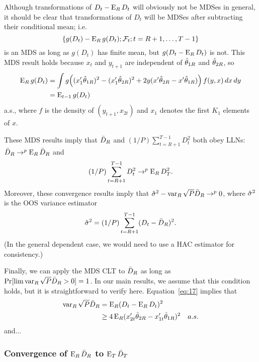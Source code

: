 \documentclass[12pt]{article}
\begin{document}
Although transformations of $D_t - \operatorname{E}_R D_t$ will obviously not be
MDSes in general, it should be clear that transformations of $D_t$
will be MDSes after subtracting their conditional mean; i.e.
\begin{equation}
  \{g(D_t) - \operatorname{E}_R g(D_t); \mathcal{F}_t; t = R+1,\dots,T-1\}
\end{equation}
is an MDS as long as
$g(D_t)$ has finite mean, but $g(D_t - \operatorname{E}_R D_t)$ is not. This MDS
result holds because $x_t$ and $y_{t+1}$ are independent of $\hat\theta_{1R}$
and $\hat\theta_{2R}$, so
\begin{equation}\begin{split}
  \operatorname{E}_R g(D_t)
  &= \int g\Big((x_1'\hat\theta_{1R})^2 - (x_1'\hat\theta_{2R})^2
       + 2 y (x'\hat\theta_{2R} - x'\hat\theta_{1R})\Big) \, f(y, x) \, dx \, dy \\
  &= \operatorname{E}_{t-1} g(D_t)
\end{split}\end{equation}
a.s., where $f$ is the density of $(y_{t+1}, x_{2t})$ and $x_1$
denotes the first $K_1$ elements of $x$.

These MDS results imply that $\bar{D}_{R}$ and $(1/P) \sum_{t=R+1}^{T-1}
D_t^2$ both obey LLNs: $\bar{D}_{R} \to^p \operatorname{E}_R \bar{D}_{R}$ and
\begin{equation}
  (1/P) \sum_{t=R+1}^{T-1} D_t^2 \to^p \operatorname{E}_R D_T^2.
\end{equation}
Moreover, these convergence results imply that $\hat{\sigma}^2 - \operatorname{var}_R
\sqrt{P} \bar{D}_{R} \to^p 0$, where $\hat{\sigma}^2$ is the OOS variance estimator
\begin{equation}
  \hat{\sigma}^2 = (1/P) \sum_{t=R+1}^{T-1} (D_t - \bar{D}_{R})^2.
\end{equation}
(In the general dependent case, we would need to use a HAC estimator
for consistency.)

Finally, we can apply the MDS CLT to $\bar{D}_{R}$ as long as $\Pr[\lim
\operatorname{var}_R \sqrt{P} \bar{D}_{R} > 0] = 1$. \citep[Theorem 3.2.]{HaH:80} In our
main results, we assume that this condition holds, but it is
straightforward to verify here. Equation~\eqref{eq:17} implies that
\begin{equation}
  \begin{split}
    \operatorname{var}_R \sqrt{P} \bar{D}_{R} &= \operatorname{E}_R(D_t - \operatorname{E}_R D_t)^2 \\
    &\geq 4 \operatorname{E}_R (x_{2t}' \hat\theta_{2R} - x_{1t}' \hat\theta_{1R})^2
    \quad a.s.
  \end{split}
\end{equation}
and...

\subsubsection*{Convergence of $\operatorname{E}_R \bar{D}_{R}$ to $\operatorname{E}_T \bar{D}_{T}$}
\end{document}
